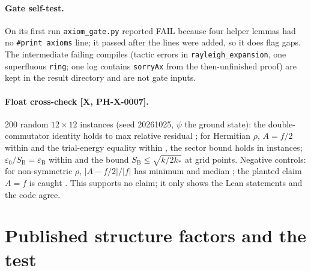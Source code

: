 \documentclass[11pt]{article}
\theoremstyle{remark}
\newcommand{\tier}[1]{\textsf{[#1]}}
\newcommand{\lean}[1]{\texttt{#1}}
\newcommand{\ks}{k_*}
\newcommand{\eps}{\varepsilon}
\newcommand{\SB}{S_{\mathrm B}}
\newcommand{\eB}{\varepsilon_{\mathrm B}}
\begin{document}
\paragraph{Gate self-test.} On its first run \texttt{axiom\_gate.py} reported FAIL because four helper lemmas had no \lean{\#print axioms} line; it passed after the lines were added, so it does flag gaps. The intermediate failing compiles
(tactic errors in \lean{rayleigh\_expansion}, one superfluous \lean{ring}; one log contains \lean{sorryAx} from the then-unfinished proof) are kept in the result directory and are not gate inputs.

\paragraph{Float cross-check \tier{X, PH-X-0007}.} 200 random $12\times12$ instances (seed 20261025, $\psi$ the ground state): the double-commutator identity holds to max relative residual \PXPosOne;
for Hermitian $\rho$, $A=f/2$ within \PXPosTwo{} and the trial-energy equality within \PXPosTrial, the sector bound holds in \PXSector{} instances; $\eps_0/\SB=\eB$ within \PXPosBog{} and the bound $\SB\le\sqrt{k/2\ks}$ at \PXHeight{} grid points.
Negative controls: for non-symmetric $\rho$, $|A-f/2|/|f|$ has minimum \PXNegMin{} and median \PXNegMed; the planted claim $A=f$ is caught \PXNegCaught. This supports no claim; it only shows the Lean statements and the code agree.

\section{Published structure factors and the test}\label{sec:data}
\end{document}

